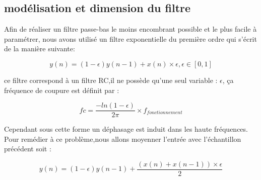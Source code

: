 \documentclass[hidelinks]{article}
\begin{document}
    \subsection{modélisation et dimension du filtre}
    Afin de réaliser un filtre passe-bas le moins encombrant possible et le plus facile à paramétrer, nous avons utilisé un filtre exponentielle du première ordre qui s'écrit de la manière suivante: 
	\begin{center}
		\begin{equation}
			y(n)=(1-\epsilon)y(n-1)+x(n)\times\epsilon ,\epsilon \in [0,1]
		\end{equation}
	\end{center}    
    ce filtre correspond à un filtre RC,il ne possède qu'une seul variable : $\epsilon$, ça fréquence de coupure est définit par :
    \begin{center}
    	\begin{equation}
    	fc=\frac{-ln(1-\epsilon)}{2\pi}\times f_{fonctionnement}
    	\label{fc}
    	\end{equation}
    \end{center}    
    Cependant sous cette forme un déphasage est induit dans les haute fréquences. Pour remédier à ce problème,nous allons moyenner l'entrée avec l'échantillon précédent soit :
	\begin{center}
		\begin{equation}
			y(n)=(1-\epsilon)y(n-1)+\frac{(x(n)+x(n-1))\times\epsilon}{2}
			\label{formule_f}
		\end{equation}
	\end{center}  
    
\end{document}
